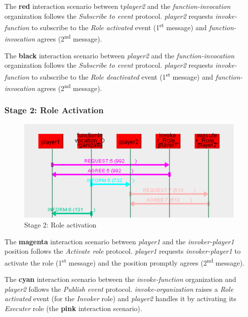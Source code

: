 The \textbf{red} interaction scenario between t\textit{player2} and the \textit{function-invocation} organization follows the \textit{Subscribe to event} protocol.
\textit{player2} requests \textit{invoke-function} to subscribe to the \textit{Role activated} event (1\textsuperscript{st} message) and \textit{function-invocation} agrees (2\textsuperscript{nd} message).

The \textbf{black} interaction scenario between \textit{player2} and the \textit{function-invocation} organization follows the \textit{Subscribe to event} protocol.
\textit{player2} requests \textit{invoke-function} to subscribe to the \textit{Role deactivated} event (1\textsuperscript{st} message) and \textit{function-invocation} agrees (2\textsuperscript{nd} message).

\subsubsection*{Stage 2: Role Activation}

\begin{figure}[H]
	\centering
	\includegraphics[width=\textwidth]{images/example1-stage2.png}
	\caption{Stage 2: Role activation}
	\label{figure:example1-stage2}
\end{figure}

The \textbf{magenta} interaction scenario between \textit{player1} and the \textit{invoker-player1} position follows the \textit{Activate role} protocol.
\textit{player1} requests \textit{invoker-player1} to activate the role (1\textsuperscript{st} message) and the position promptly agrees (2\textsuperscript{nd} message).

The \textbf{cyan} interaction scenario between the \textit{invoke-function} organization and \textit{player2} follows the \textit{Publish event} protocol.
\textit{invoke-organization} raises a \textit{Role activated} event (for the \textit{Invoker} role) and \textit{player2} handles it by activating its \textit{Executer} role (the \textbf{pink} interaction scenario).


